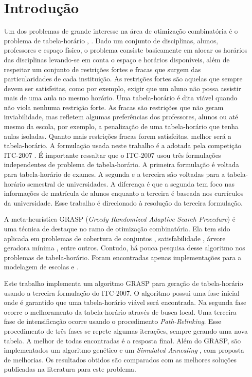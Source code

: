 \documentclass[11pt]{article}
\begin{document}
\newpage
 
\section{Introdução}

Um dos problemas de grande interesse na área de otimização combinatória é o problema de tabela-horário \cite{Schaerf95asurvey}, \cite{Lewis2007:survey}. Dado um conjunto de disciplinas, alunos, professores e espaço físico, o problema consiste basicamente em alocar os horários das disciplinas levando-se em conta o espaço e horários disponíveis, além de respeitar um conjunto de restrições fortes e fracas que surgem das particularidades de cada instituição. As restrições fortes são aquelas que sempre devem ser satisfeitas, como por exemplo, exigir que um aluno não possa assistir mais de uma aula no mesmo horário. Uma tabela-horário é dita viável quando não viola nenhuma restrição forte. As fracas são restrições que não geram inviabilidade, mas refletem algumas preferências dos professores, alunos ou até mesmo da escola, por exemplo, a penalização de uma tabela-horário que tenha aulas isoladas. Quanto mais restrições fracas forem satisfeitas, melhor será a tabela-horário. A formulação usada neste trabalho é a adotada pela competição ITC-2007 \cite{itc2007}. É importante ressaltar que o ITC-2007 usou três formulações independentes de problema de tabela-horário. A primeira formulação é voltada para tabela-horário de exames. A segunda e a terceira são voltadas para a tabela-horário semestral de universidades. A diferença é que a segunda tem foco nas informações de matrícula de alunos enquanto a terceira é baseada nos currículos da universidade. Esse trabalho é direcionado à resolução da terceira formulação.

A meta-heurística GRASP (\textit{Greedy Randomized Adaptive Search Procedure}) \cite{grasp_resende_ribeiro} é uma técnica de destaque no ramo de otimização combinatória. Ela tem sido aplicada em problemas de cobertura de conjuntos \cite{Res98}, satisfabilidade \cite{FesParPitRes06a}, árvore geradora mínima \cite{Souza02agrasp}, entre outros. Contudo, há pouca pesquisa desse algoritmo nos problemas de tabela-horário. Foram encontradas apenas implementações para a modelagem de escolas \cite{Souza:2004} e \cite{Vieira_agrasp}.

Este trabalho implementa um algoritmo GRASP para geração de tabela-horário usando a terceira formulação do ITC-2007. O algoritmo possui uma fase inicial onde é garantido que uma tabela-horário viável será encontrada. Na segunda fase ocorre o melhoramento da tabela-horário através de busca local. Uma terceira fase de intensificação ocorre usando o procedimento \textit{Path-Relinking}. Esse procedimento de três fases se repete algumas iterações, sempre gerando uma nova tabela. A melhor de todas encontradas é a resposta final. Além do GRASP, são implementados um algoritmo genético \cite{massoodian2008} e um \textit{Simulated Annealing} \cite{CDGS11b}, com proposta de melhorias. Os resultados obtidos são comparados com as melhores soluções publicadas na literatura para este problema.
\end{document}
